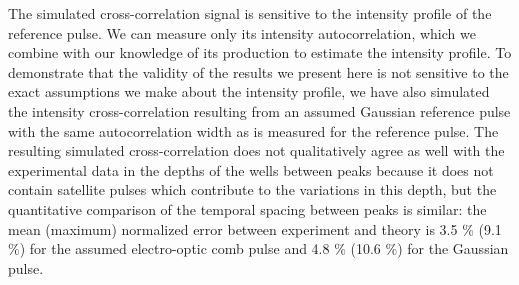 The simulated cross-correlation signal is sensitive to the intensity profile of the reference pulse. We can measure only its intensity autocorrelation, which we combine with our knowledge of its production to estimate the intensity profile. To demonstrate that the validity of the results we present here is not sensitive to the exact assumptions we make about the intensity profile, we have also simulated the intensity cross-correlation resulting from an assumed Gaussian reference pulse with the same autocorrelation width as is measured for the reference pulse. The resulting simulated cross-correlation does not qualitatively agree as well with the experimental data in the depths of the wells between peaks because it does not contain satellite pulses which contribute to the variations in this depth, but the quantitative comparison of the temporal spacing between peaks is similar: the mean (maximum) normalized error between experiment and theory is 3.5 $\%$ (9.1 $\%$) for the assumed electro-optic comb pulse and 4.8 $\%$ (10.6 $\%$) for the Gaussian pulse.






